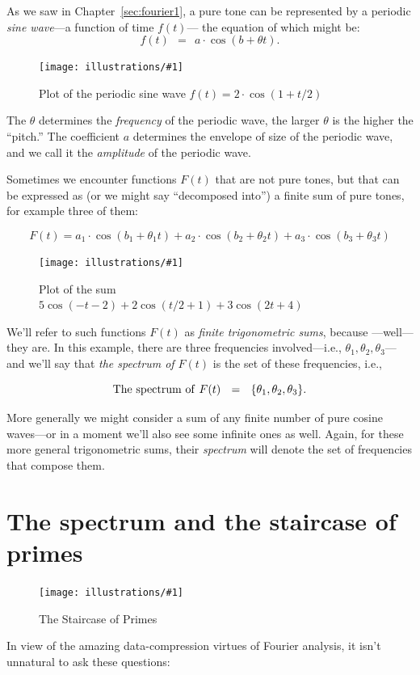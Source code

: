 \documentclass[openany]{book}
\newcommand{\ill}[3]{%
   \begin{figure}[H]%
   \vspace{-2ex}
   \centering%
   \texttt{[image: illustrations/\#1]}%
   \caption{#3}%
   \vspace{-2ex}
    \end{figure}}
\theoremstyle{plain}
\theoremstyle{definition}
\begin{document}
As we saw in Chapter~\ref{sec:fourier1}, a pure tone can be represented by a periodic {\it sine wave}---a function of  time $f(t)$--- the equation of which might be:
$$f(t)\ \ = \ \ a\cdot \cos(b +\theta t).$$  

\ill{pure_tone}{.7}{Plot of the periodic sine wave $f(t) = 2\cdot \cos(1+t/2)$}

The $\theta$ determines the {\it frequency} of the periodic wave, the
larger $\theta$ is the higher the ``pitch.''  The coefficient $a$
determines the envelope of size of the periodic wave, and we call it
the {\it amplitude} of the periodic wave.

Sometimes we encounter functions $F(t)$ that are not pure tones, but
that can be expressed as (or we might say ``decomposed into'') a finite
sum of pure tones, for example three of them:

$$F(t)  = a_1\cdot \cos(b_1 +\theta_1 t) + a_2\cdot \cos(b_2 +\theta_2 t) + a_3\cdot \cos(b_3 +\theta_3 t)$$

\ill{mixed_tone3}{.7}{Plot of the sum $5  \cos\left(-t - 2\right) + 2 \cos\left(t/2 + 1\right) + 3  \cos\left(2  t + 4\right)$}

We'll refer to such functions $F(t)$ as {\it finite trigonometric
  sums}, because ---well---they are.  In this example, there are three
frequencies involved---i.e., $\theta_1,\theta_2,\theta_3$---and we'll
say that {\it the spectrum of $F(t)$} is the set of these frequencies,
i.e.,
  
$$ 
  {\rm The\ spectrum \ of \ } F(t) \ \ = \ \ \{\theta_1,\theta_2,\theta_3\}.
$$
  
More generally we might consider a sum of any finite number of pure
cosine waves---or in a moment we'll also see some infinite ones as
well. Again, for these more general trigonometric sums, their {\it
  spectrum} will denote the set of frequencies that compose them.

\chapter{The spectrum and the staircase of primes\label{sec:fourier_staircase}}

\ill{prime_pi_100_aspect1}{0.95}{The Staircase of Primes\label{fig:staircase100}}

 
In view of the amazing data-compression virtues of Fourier analysis,
it isn't unnatural to ask these questions:
\end{document}
